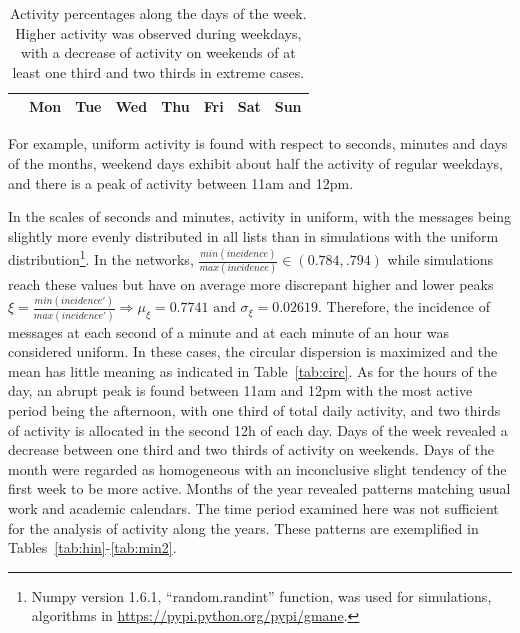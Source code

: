 \documentclass[%
	aip,
	jmp,%
	amsmath,amssymb,
	reprint,%
]{revtex4-1}
\begin{document}
\begin{table}
	\caption{Activity percentages along the days of the week.
	Higher activity was observed during weekdays, with a decrease of activity on weekends of at least one third and two thirds in extreme cases.}
	\begin{center}
		\begin{tabular}{ | l |  c | c | c | c | c |   c | c |}
			\hline
			& Mon & Tue & Wed & Thu & Fri & Sat & Sun  \\ \hline
			
		\end{tabular}
	\end{center}
	\label{tab:win}
\end{table}
For example, uniform activity is found with respect to seconds, minutes and days of the months,
weekend days exhibit about half the activity of regular weekdays,
and there is a peak of activity between 11am and 12pm.

In the scales of seconds and minutes, activity in uniform,
with the messages being slightly more evenly distributed in all lists than in simulations with the uniform distribution\footnote{Numpy version 1.6.1, ``random.randint'' function, was used for simulations, algorithms in \url{https://pypi.python.org/pypi/gmane}.}.
In the networks, $\frac{min(incidence)}{max(incidence)} \in (0.784,.794)$ while simulations reach these values but have on average more discrepant higher and lower peaks $\xi=\frac{min(incidence')}{max(incidence')} \Rightarrow \mu_\xi=0.7741 \text{ and } \sigma_\xi=0.02619$.
Therefore, the incidence of messages at each second of a minute and at each minute of an hour was considered uniform.
In these cases, the circular dispersion is maximized and the mean has little meaning as indicated in Table~\ref{tab:circ}.
As for the hours of the day, an abrupt peak is found between 11am and 12pm with the most active period being the afternoon, with one third of total daily activity, and two thirds of activity is allocated in the second 12h of each day.
Days of the week revealed a decrease between one third and two thirds of activity on weekends.
Days of the month were regarded as homogeneous with an inconclusive slight tendency of the first week to be more active.
Months of the year revealed patterns matching usual work and academic calendars.
The time period examined here was not sufficient for the analysis of activity along the years. These patterns are exemplified in Tables~\ref{tab:hin}-\ref{tab:min2}.


\FloatBarrier
\end{document}
